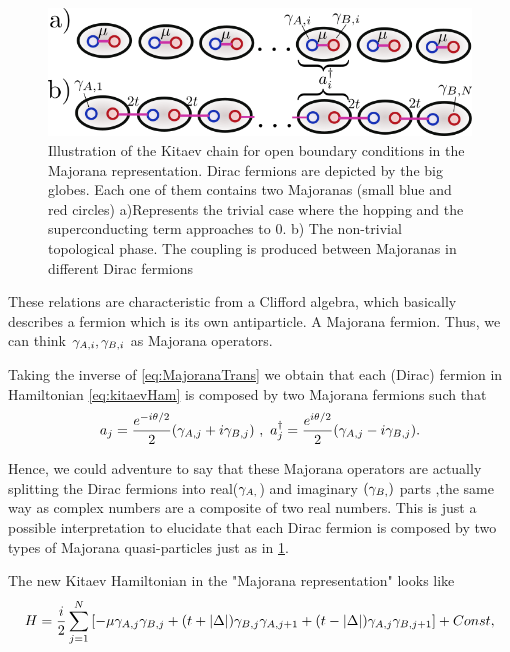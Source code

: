 \begin{figure}[t]
    \centering
    \includegraphics[scale=0.5]{IMAGES/Majorana/KitaevChain.png}
    
    \caption{ \label{fig:top.phases kitaev} Illustration of the Kitaev chain for open boundary conditions in the Majorana representation. Dirac fermions are depicted by the big globes. Each one of them contains two Majoranas (small blue and red circles) a)Represents the trivial case where the hopping and the superconducting term approaches to $0$. b) The non-trivial topological phase. The coupling is produced between Majoranas in different Dirac fermions \protect{} }
\end{figure} 
\noindent These relations are characteristic from a Clifford algebra, which basically describes a fermion which is its own antiparticle. A Majorana fermion. Thus, we can think $\gamma_{A,i} , \gamma_{B,i}$ as Majorana operators.

Taking the inverse of \eqref{eq:MajoranaTrans} we obtain that each  (Dirac) fermion in Hamiltonian \eqref{eq:kitaevHam} is composed by two Majorana fermions such that 
\begin{equation}
a_j = \frac{e^{-i\theta/2}}{2}(\gamma_{A,j}+ i\gamma_{B,j}) \ ,\ a^\dagger_j = \frac{e^{i\theta/2}}{2}(\gamma_{A,j}- i\gamma_{B,j}).
\end{equation}

\noindent Hence, we could adventure to say that these Majorana operators are actually splitting the Dirac fermions into real($\gamma_{A,}$) and imaginary $(\gamma_{B,})$ parts ,the same way as complex numbers are a composite of two real numbers. This is just a possible interpretation to elucidate that each Dirac fermion is composed by two types of Majorana quasi-particles just as in \ref{fig:top.phases kitaev}. 

The new Kitaev Hamiltonian in the "Majorana representation" looks like 
\begin{equation}
H = \frac{i}{2} \sum_{j=1}^N \left[ -\mu \gamma_{A,j}\gamma_{B,j}  + (t+ \vert \Delta \vert) \gamma_{B,j}\gamma_{A,j+1} + (t- \vert \Delta \vert) \gamma_{A,j}\gamma_{B,j+1} \right]+Const,\label{eq:HamMajorana}
\end{equation}

